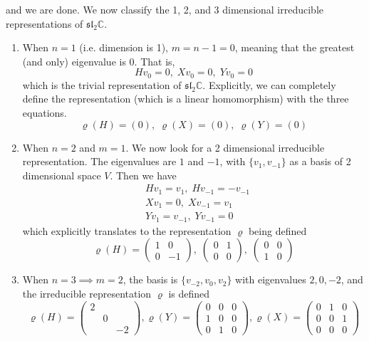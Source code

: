   and we are done. We now classify the 1, 2, and 3 dimensional irreducible representations of $\mathfrak{sl}_2 \mathbb{C}$. 
  \begin{enumerate}
    \item When $n = 1$ (i.e. dimension is 1), $m = n-1 = 0$, meaning that the greatest (and only) eigenvalue is $0$. That is, 
      \begin{equation}
        H v_0 = 0,\; X v_0 = 0,\; Y v_0 = 0
      \end{equation}
    which is the trivial representation of $\mathfrak{sl}_2 \mathbb{C}$. Explicitly, we can completely define the representation (which is a linear homomorphism) with the three equations. 
    \begin{equation}
      \varrho(H) = (0),\; \varrho(X) = (0),\; \varrho(Y) = (0)
    \end{equation}

    \item When $n = 2$ and $m=1$. We now look for a 2 dimensional irreducible representation. The eigenvalues are $1$ and $-1$, with $\{v_1, v_{-1}\}$ as a basis of 2 dimensional space $V$. Then we have 
      \begin{align*}
        & Hv_1 = v_1, \; Hv_{-1} = - v_{-1} \\
        & X v_1 = 0, \; X v_{-1} = v_1 \\
        & Y v_1 = v_{-1}, \; Y v_{-1} = 0
      \end{align*}
    which explicitly translates to the representation $\varrho$ being defined
    \begin{equation}
      \varrho(H) = \begin{pmatrix}
      1&0\\0&-1
      \end{pmatrix}, \; \begin{pmatrix}
      0&1\\0&0
      \end{pmatrix}, \; \begin{pmatrix}
      0&0\\1&0
      \end{pmatrix}
    \end{equation}

    \item When $n=3 \implies m=2$, the basis is $\{v_{-2}, v_0, v_2\}$ with eigenvalues $2, 0, -2$, and the irreducible representation $\varrho$ is defined
      \begin{equation}
        \varrho(H) = \begin{pmatrix}
        2&&\\&0&\\&&-2
        \end{pmatrix}, \varrho(Y) = \begin{pmatrix}
        0&0&0\\1&0&0\\0&1&0
        \end{pmatrix}, \varrho(X) = \begin{pmatrix}
        0&1&0\\0&0&1\\0&0&0
        \end{pmatrix}
      \end{equation}


\end{enumerate}
